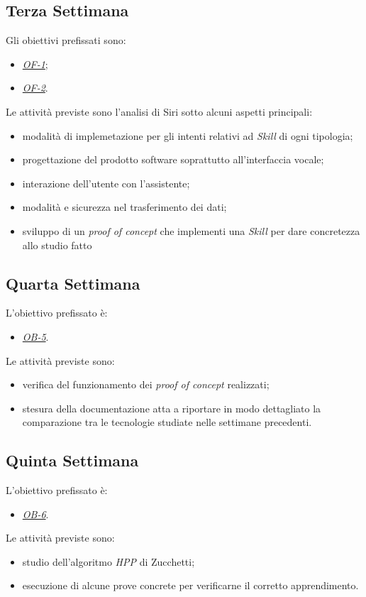 	\subsection*{Terza Settimana}
	Gli obiettivi prefissati sono:
	\begin{itemize}
		\item \textit{\underline{OF-1}};
		\item \textit{\underline{OF-2}}.
	\end{itemize}
	Le attività previste sono l'analisi di Siri sotto alcuni aspetti principali:
	\begin{itemize}
		\item modalità di implemetazione per gli intenti relativi ad \textit{Skill} di ogni tipologia;
		\item progettazione del prodotto software soprattutto all'interfaccia vocale;
		\item interazione dell'utente con l'assistente;
		\item modalità e sicurezza nel trasferimento dei dati;
		\item sviluppo di un \textit{proof of concept} che implementi una \textit{Skill} per dare concretezza allo studio fatto 
	\end{itemize}
	\subsection*{Quarta Settimana}
	L'obiettivo prefissato è:
	\begin{itemize}
		\item \textit{\underline{OB-5}}.
	\end{itemize}
	Le attività previste sono:
	\begin{itemize}
		\item verifica del funzionamento dei \textit{proof of concept} realizzati;
		\item stesura della documentazione atta a riportare in modo dettagliato la comparazione tra le tecnologie studiate nelle settimane precedenti.
	\end{itemize}
	\subsection*{Quinta Settimana}
	L'obiettivo prefissato è:
	\begin{itemize}
		\item \textit{\underline{OB-6}}.
	\end{itemize}
	Le attività previste sono:
	\begin{itemize}
		\item studio dell'algoritmo \textit{HPP} di Zucchetti;
		\item esecuzione di alcune prove concrete per verificarne il corretto apprendimento.
	\end{itemize}
